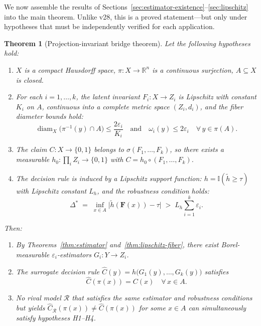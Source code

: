 \documentclass[11pt]{article}
\newtheorem{theorem}{Theorem}
\begin{document}
We now assemble the results of Sections~\ref{sec:estimator-existence}--\ref{sec:lipschitz} into the main theorem. Unlike v28, this is a proved statement---but only under hypotheses that must be independently verified for each application.

\begin{theorem}[Projection-invariant bridge theorem]\label{thm:bridge}
Let the following hypotheses hold:
\begin{enumerate}
\item[\textbf{H1.}] $X$ is a compact Hausdorff space, $\pi\colon X\to\mathbb{R}^n$ is a continuous surjection, $A\subseteq X$ is closed.
\item[\textbf{H2.}] For each $i=1,\ldots,k$, the latent invariant $F_i\colon X\to Z_i$ is Lipschitz with constant $K_i$ on $A$, continuous into a complete metric space $(Z_i,d_i)$, and the fiber diameter bounds hold:
\[
\operatorname{diam}_X\!\bigl(\pi^{-1}(y)\cap A\bigr)\leq\frac{2\varepsilon_i}{K_i}\quad\text{and}\quad\omega_i(y)\leq 2\varepsilon_i\quad\forall\,y\in\pi(A).
\]
\item[\textbf{H3.}] The claim $C\colon X\to\{0,1\}$ belongs to $\sigma(F_1,\ldots,F_k)$, so there exists a measurable $h_0\colon\prod_i Z_i\to\{0,1\}$ with $C=h_0\circ(F_1,\ldots,F_k)$.
\item[\textbf{H4.}] The decision rule is induced by a Lipschitz support function: $h=\mathbb{I}(\tilde{h}\geq\tau)$ with Lipschitz constant $L_h$, and the robustness condition holds:
\[
\Delta^{*}\;=\;\inf_{x\in A}\bigl|\tilde{h}(\mathbf{F}(x))-\tau\bigr|\;>\;L_h\sum_{i=1}^k\varepsilon_i.
\]
\end{enumerate}

Then:
\begin{enumerate}
\item[\textbf{C1.}] By Theorems~\ref{thm:estimator} and~\ref{thm:lipschitz-fiber}, there exist Borel-measurable $\varepsilon_i$-estimators $G_i\colon Y\to Z_i$.
\item[\textbf{C2.}] The surrogate decision rule $\hat{C}(y)=h\bigl(G_1(y),\ldots,G_k(y)\bigr)$ satisfies
\[
\hat{C}(\pi(x))=C(x)\quad\forall\,x\in A.
\]
\item[\textbf{C3.}] No rival model $\mathcal{R}$ that satisfies the same estimator and robustness conditions but yields $\hat{C}_{\mathcal{R}}(\pi(x))\neq\hat{C}(\pi(x))$ for some $x\in A$ can simultaneously satisfy hypotheses H1--H4.
\end{enumerate}
\end{theorem}
\end{document}
